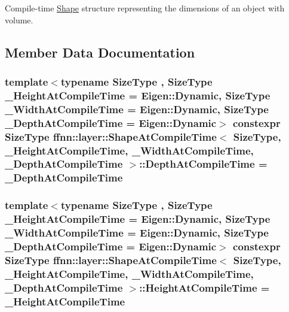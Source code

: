 Compile-\/time \hyperlink{structffnn_1_1layer_1_1_shape}{Shape} structure representing the dimensions of an object with volume. 

\subsection{Member Data Documentation}
\hypertarget{structffnn_1_1layer_1_1_shape_at_compile_time_a94daa70f5c1e1e85de32bd6234fb675a}{
\subsubsection[{Depth\-At\-Compile\-Time}]{\setlength{\rightskip}{0pt plus 5cm}template$<$typename Size\-Type , Size\-Type \-\_\-\-Height\-At\-Compile\-Time = Eigen\-::\-Dynamic, Size\-Type \-\_\-\-Width\-At\-Compile\-Time = Eigen\-::\-Dynamic, Size\-Type \-\_\-\-Depth\-At\-Compile\-Time = Eigen\-::\-Dynamic$>$ constexpr Size\-Type {\bf ffnn\-::layer\-::\-Shape\-At\-Compile\-Time}$<$ Size\-Type, \-\_\-\-Height\-At\-Compile\-Time, \-\_\-\-Width\-At\-Compile\-Time, \-\_\-\-Depth\-At\-Compile\-Time $>$\-::Depth\-At\-Compile\-Time = \-\_\-\-Depth\-At\-Compile\-Time\hspace{0.3cm}{\ttfamily [static]}}}\label{structffnn_1_1layer_1_1_shape_at_compile_time_a94daa70f5c1e1e85de32bd6234fb675a}
\hypertarget{structffnn_1_1layer_1_1_shape_at_compile_time_a5b9207d5695b3f41d8ebf77bd45853a9}{
\subsubsection[{Height\-At\-Compile\-Time}]{\setlength{\rightskip}{0pt plus 5cm}template$<$typename Size\-Type , Size\-Type \-\_\-\-Height\-At\-Compile\-Time = Eigen\-::\-Dynamic, Size\-Type \-\_\-\-Width\-At\-Compile\-Time = Eigen\-::\-Dynamic, Size\-Type \-\_\-\-Depth\-At\-Compile\-Time = Eigen\-::\-Dynamic$>$ constexpr Size\-Type {\bf ffnn\-::layer\-::\-Shape\-At\-Compile\-Time}$<$ Size\-Type, \-\_\-\-Height\-At\-Compile\-Time, \-\_\-\-Width\-At\-Compile\-Time, \-\_\-\-Depth\-At\-Compile\-Time $>$\-::Height\-At\-Compile\-Time = \-\_\-\-Height\-At\-Compile\-Time\hspace{0.3cm}{\ttfamily [static]}}}\label{structffnn_1_1layer_1_1_shape_at_compile_time_a5b9207d5695b3f41d8ebf77bd45853a9}
